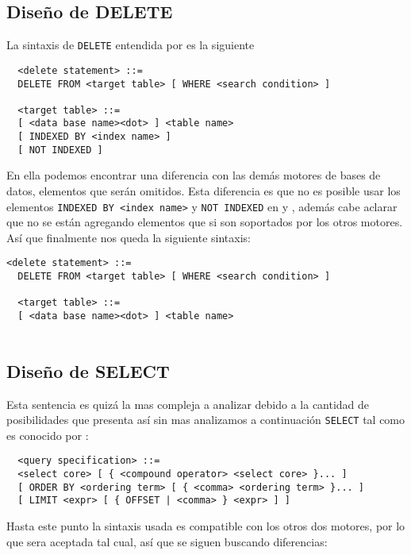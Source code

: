 \subsection{Diseño de DELETE}
La sintaxis de \verb=DELETE= entendida por \s es la siguiente
\begin{Verbatim}
  <delete statement> ::=
  DELETE FROM <target table> [ WHERE <search condition> ]

  <target table> ::=
  [ <data base name><dot> ] <table name>
  [ INDEXED BY <index name> ]
  [ NOT INDEXED ]
\end{Verbatim}
En ella podemos encontrar una diferencia con las demás motores de bases de datos, elementos que serán omitidos. Esta diferencia es que no es posible usar los elementos \verb=INDEXED BY <index name>= y \verb=NOT INDEXED= en \p y \m, además cabe aclarar que no se están agregando elementos que si son soportados por los otros motores. Así que finalmente nos queda la siguiente sintaxis:


\begin{Verbatim}[frame=single, label=sintaxis para DELETE]
  <delete statement> ::=
  DELETE FROM <target table> [ WHERE <search condition> ]
  
  <target table> ::=
  [ <data base name><dot> ] <table name>
  
\end{Verbatim}




\subsection{Diseño de SELECT}
Esta sentencia es quizá la mas compleja a analizar debido a la cantidad de posibilidades que presenta así sin mas analizamos a continuación \verb=SELECT= tal como es conocido por \s:

\begin{Verbatim}
  <query specification> ::=
  <select core> [ { <compound operator> <select core> }... ]
  [ ORDER BY <ordering term> [ { <comma> <ordering term> }... ]
  [ LIMIT <expr> [ { OFFSET | <comma> } <expr> ] ]  
\end{Verbatim}

Hasta este punto la sintaxis usada es compatible con los otros dos motores, por lo que sera aceptada tal cual, así que se siguen buscando diferencias:


